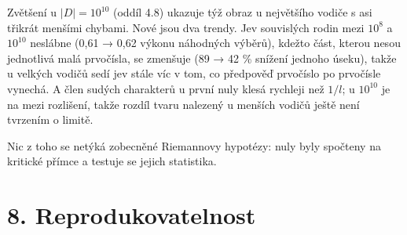 \documentclass[
  10pt,
]{article}
\begin{document}
Zvětšení u \(|D| = 10^{10}\) (oddíl 4.8) ukazuje týž obraz u největšího
vodiče s asi třikrát menšími chybami. Nové jsou dva trendy. Jev
souvislých rodin mezi \(10^8\) a \(10^{10}\) neslábne (0,61 → 0,62
výkonu náhodných výběrů), kdežto část, kterou nesou jednotlivá malá
prvočísla, se zmenšuje (89 → 42 \% snížení jednoho úseku), takže u
velkých vodičů sedí jev stále víc v tom, co předpověď prvočíslo po
prvočísle vynechá. A člen sudých charakterů u první nuly klesá rychleji
než \(1/l\); u \(10^{10}\) je na mezi rozlišení, takže rozdíl tvaru
nalezený u menších vodičů ještě není tvrzením o limitě.

Nic z toho se netýká zobecněné Riemannovy hypotézy: nuly byly spočteny
na kritické přímce a testuje se jejich statistika.

\hypertarget{reprodukovatelnost}{%
\section{8. Reprodukovatelnost}\label{reprodukovatelnost}}
\end{document}

